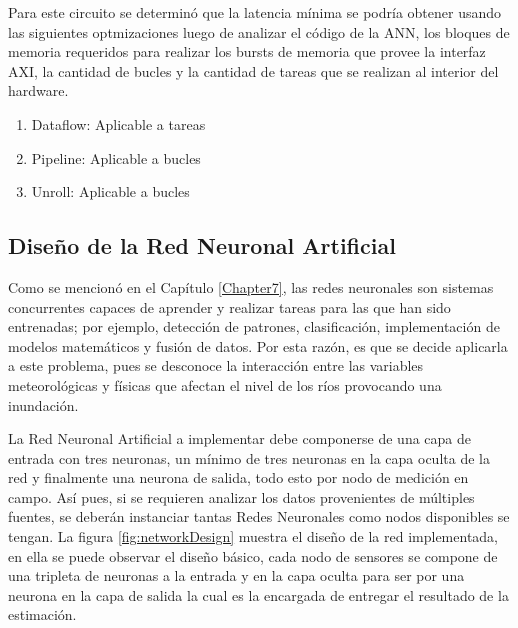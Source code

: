 Para este circuito se determinó que la latencia mínima se podría obtener usando las siguientes optmizaciones luego de analizar el código de la ANN, los bloques de memoria requeridos para realizar los bursts de memoria que provee la interfaz AXI, la cantidad de bucles y la cantidad de tareas que se realizan al interior del hardware.

\begin{enumerate}
\item Dataflow: Aplicable a tareas
\item Pipeline: Aplicable a bucles
\item Unroll: Aplicable a bucles
\end{enumerate}

\subsection{Diseño de la Red Neuronal Artificial}

Como se mencionó en el Capítulo \ref{Chapter7}, las redes neuronales son sistemas concurrentes capaces de aprender y realizar tareas para las que han sido entrenadas; por ejemplo, detección de patrones, clasificación, implementación de modelos matemáticos y fusión de datos. Por esta razón, es que se decide aplicarla a este problema, pues se desconoce la interacción entre las variables meteorológicas y físicas que afectan el nivel de los ríos provocando una inundación.

La Red Neuronal Artificial a implementar debe componerse de una capa de entrada con tres neuronas, un mínimo de tres neuronas en la capa oculta de la red y finalmente una neurona de salida, todo esto por nodo de medición en campo. Así pues, si se requieren analizar los datos provenientes de múltiples fuentes, se deberán instanciar tantas Redes Neuronales como nodos disponibles se tengan. La figura \ref{fig:networkDesign} muestra el diseño de la red implementada, en ella se puede observar el diseño básico, cada nodo de sensores se compone de una tripleta de neuronas a la entrada y en la capa oculta para ser por una neurona en la capa de salida la cual es la encargada de entregar el resultado de la estimación.


